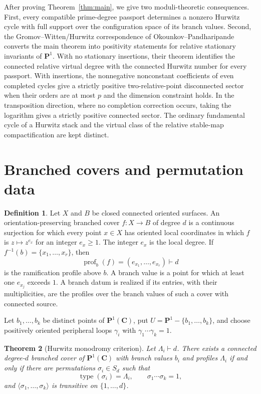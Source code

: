 \documentclass[11pt]{amsart}
\theoremstyle{plain}
\newtheorem{theorem}{Theorem}[section]
\theoremstyle{definition}
\newtheorem{definition}[theorem]{Definition}
\numberwithin{equation}{section}
\begin{document}
After proving Theorem~\ref{thm:main}, we give two moduli-theoretic
consequences.  First, every compatible prime-degree passport determines a
nonzero Hurwitz cycle with full support over the configuration space of its
branch values.  Second, the Gromov--Witten/Hurwitz correspondence of
Okounkov--Pandharipande \cite{OkounkovPandharipande} converts the main
theorem into positivity statements for relative stationary invariants of
$\mathbf P^1$.  With no stationary insertions, their theorem identifies the
connected relative virtual degree with the connected Hurwitz number for
every passport.  With insertions, the nonnegative nonconstant coefficients
of even completed cycles give a strictly positive two-relative-point
disconnected sector when their orders are at most $p$ and the dimension
constraint holds.  In the transposition direction, where no completion
correction occurs, taking the logarithm gives a strictly positive connected
sector.  The ordinary
fundamental cycle of a Hurwitz stack and the virtual class of the relative
stable-map compactification are kept distinct.

\section{Branched covers and permutation data}

\begin{definition}
Let $X$ and $B$ be closed connected oriented surfaces.  An
orientation-preserving branched cover $f:X\to B$ of degree $d$ is a
continuous surjection for which every point $x\in X$ has oriented local
coordinates in which $f$ is $z\mapsto z^{e_x}$ for an integer $e_x\geq1$.
The integer $e_x$ is the local degree.  If
$f^{-1}(b)=\{x_1,\ldots,x_r\}$, then
\[
 \operatorname{prof}_b(f)=(e_{x_1},\ldots,e_{x_r})\vdash d
\]
is the ramification profile above $b$.  A branch value is a point for which
at least one $e_{x_j}$ exceeds $1$.  A branch datum is realized if its
entries, with their multiplicities, are the profiles over the branch values
of such a cover with connected source.
\end{definition}

Let $b_1,\ldots,b_k$ be distinct points of $\mathbf P^1(\mathbf C)$, put
$U=\mathbf P^1-\{b_1,\ldots,b_k\}$, and choose positively oriented
peripheral loops $\gamma_i$ with $\gamma_1\cdots\gamma_k=1$.

\begin{theorem}[Hurwitz monodromy criterion]\label{thm:hurwitz-criterion}
Let $\Lambda_i\vdash d$.  There exists a connected degree-$d$ branched
cover of $\mathbf P^1(\mathbf C)$ with branch values $b_i$ and profiles
$\Lambda_i$ if and only if there are permutations
$\sigma_i\in S_d$ such that
\[
 \operatorname{type}(\sigma_i)=\Lambda_i,\qquad
 \sigma_1\cdots\sigma_k=1,
\]
and $\langle\sigma_1,\ldots,\sigma_k\rangle$ is transitive on
$\{1,\ldots,d\}$.
\end{theorem}
\end{document}
